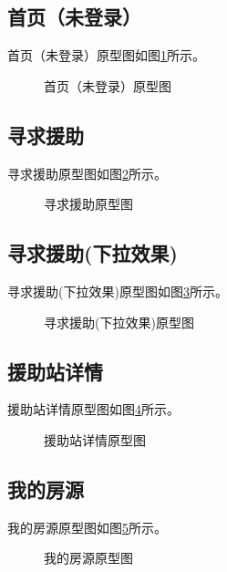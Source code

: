 \subsection{首页（未登录）}
首页（未登录）原型图如图\ref{fig:home(nonlogin)}所示。
\begin{figure}[htbp]
    \centering
    \caption{首页（未登录）原型图}\label{fig:home(nonlogin)}
    \vspace{\baselineskip} %
\end{figure}

\subsection{寻求援助}
寻求援助原型图如图\ref{fig:help1}所示。
\begin{figure}[htbp]
    \centering
    \caption{寻求援助原型图}\label{fig:help1}
    \vspace{\baselineskip} %
\end{figure}

\subsection{寻求援助(下拉效果)}
寻求援助(下拉效果)原型图如图\ref{fig:help2}所示。
\begin{figure}[htbp]
    \centering
    \caption{寻求援助(下拉效果)原型图}\label{fig:help2}
    \vspace{\baselineskip} %
\end{figure}

\subsection{援助站详情}
援助站详情原型图如图\ref{fig:station}所示。
\begin{figure}[htbp]
    \centering
    \caption{援助站详情原型图}\label{fig:station}
    \vspace{\baselineskip} %
\end{figure}

\subsection{我的房源}
我的房源原型图如图\ref{fig:myhouse}所示。
\begin{figure}[htbp]
    \centering
    \caption{我的房源原型图}\label{fig:myhouse}
    \vspace{\baselineskip} %
\end{figure}

